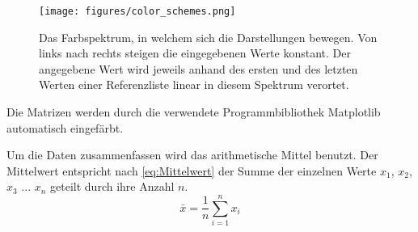 \begin{figure}
    \centering
    \texttt{[image: figures/color\_schemes.png]}
    \caption{Das Farbspektrum, in welchem sich die Darstellungen bewegen. Von links nach rechts steigen die eingegebenen Werte konstant. Der angegebene Wert wird jeweils anhand des ersten und des letzten Werten einer Referenzliste linear in diesem Spektrum verortet.}
    \label{fig:color_schemes}
\end{figure}

Die Matrizen werden durch die verwendete Programmbibliothek \glqq{}Matplotlib\grqq{} automatisch eingefärbt.


Um die Daten zusammenfassen wird das arithmetische Mittel benutzt. Der Mittelwert entspricht nach \autoref{eq:Mittelwert} der Summe der einzelnen Werte $x_1$, $x_2$, $x_3$ ... $x_n$ geteilt durch ihre Anzahl $n$.
\begin{equation}\label{eq:Mittelwert}
    \bar x = \frac{1}{n}\sum_{i=1}^n x_i
\end{equation}